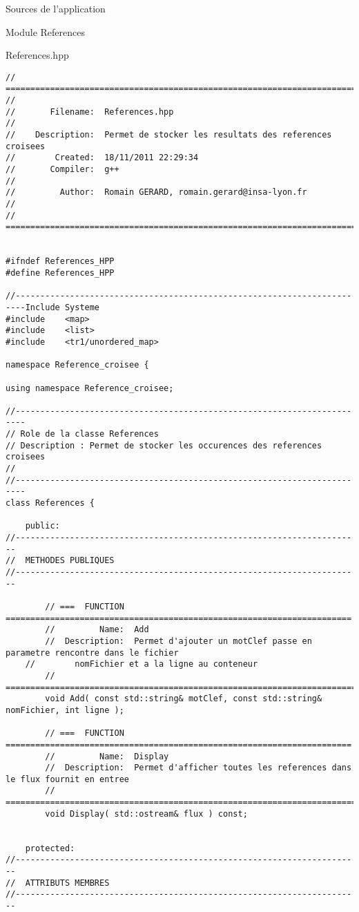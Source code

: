 \documentclass{article}
\begin{document}
\begin{section}{Sources de l'application}
\begin{subsection}{Module References}
  \begin{paragraph}{References.hpp}
   \begin{verbatim}
// =====================================================================================
//
//       Filename:  References.hpp
//
//    Description:  Permet de stocker les resultats des references croisees
//        Created:  18/11/2011 22:29:34
//       Compiler:  g++
//
//         Author:  Romain GERARD, romain.gerard@insa-lyon.fr
//
// =====================================================================================


#ifndef References_HPP
#define References_HPP

//------------------------------------------------------------------------Include Systeme
#include    <map>
#include    <list>
#include    <tr1/unordered_map>

namespace Reference_croisee {

using namespace Reference_croisee;

//------------------------------------------------------------------------
// Role de la classe References
// Description : Permet de stocker les occurences des references croisees
//
//------------------------------------------------------------------------
class References {

    public:
//----------------------------------------------------------------------
//  METHODES PUBLIQUES
//----------------------------------------------------------------------

        // ===  FUNCTION  ======================================================================
        //         Name:  Add
        //  Description:  Permet d'ajouter un motClef passe en parametre rencontre dans le fichier
	//		  nomFichier et a la ligne au conteneur
        // =====================================================================================
        void Add( const std::string& motClef, const std::string& nomFichier, int ligne );

        // ===  FUNCTION  ======================================================================
        //         Name:  Display
        //  Description:  Permet d'afficher toutes les references dans le flux fournit en entree
        // =====================================================================================
        void Display( std::ostream& flux ) const;


    protected:
//----------------------------------------------------------------------
//  ATTRIBUTS MEMBRES
//----------------------------------------------------------------------


\end{verbatim}
\end{paragraph}
\end{subsection}
\end{section}
\end{document}
